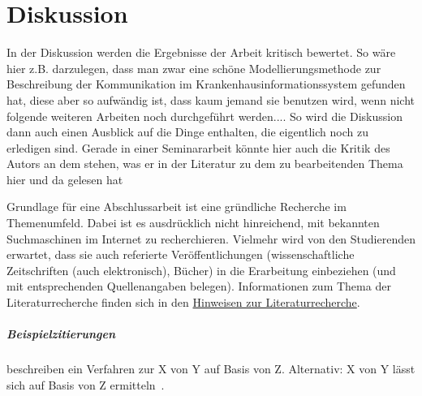 \chapter{Diskussion}\label{ch:discussion}
In der Diskussion werden die Ergebnisse der Arbeit kritisch bewertet.
So wäre hier z.B. darzulegen, dass man zwar eine schöne Modellierungsmethode zur Beschreibung der Kommunikation im Krankenhausinformationssystem gefunden hat, diese aber so aufwändig ist, dass kaum jemand sie benutzen wird, wenn nicht folgende weiteren Arbeiten noch durchgeführt werden.... So wird die Diskussion dann auch einen Ausblick auf die Dinge enthalten, die eigentlich noch zu erledigen sind.
Gerade in einer Seminararbeit könnte hier auch die Kritik des Autors an dem stehen, was er in der Literatur zu dem zu bearbeitenden Thema hier und da gelesen hat


\newpage
Grundlage für eine Abschlussarbeit ist eine gründliche Recherche im Themenumfeld. Dabei ist es ausdrücklich nicht hinreichend, mit bekannten Suchmaschinen im Internet zu recherchieren. Vielmehr wird von den Studierenden erwartet, dass sie auch referierte Veröffentlichungen (wissenschaftliche Zeitschriften (auch elektronisch), Bücher) in die Erarbeitung einbeziehen (und mit entsprechenden Quellenangaben belegen). Informationen zum Thema der Literaturrecherche finden sich in den \href{http://www.imise.uni-leipzig.de/Lehre/MedInf/Abschlussarbeiten/Literaturrecherche.jsp}{Hinweisen zur Literaturrecherche}.
\paragraph{Beispielzitierungen}
\citet{sniktec} beschreiben ein Verfahren zur X von Y auf Basis von Z.
Alternativ: X von Y lässt sich auf Basis von Z ermitteln~\citep{sniktec}.